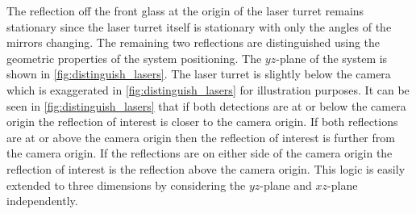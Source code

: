 The reflection off the front glass at the origin of the laser turret remains stationary since the laser turret itself is stationary with only the angles of the mirrors changing. The remaining two reflections are distinguished using the geometric properties of the system positioning. The $yz$-plane of the system is shown in \autoref{fig:distinguish_lasers}. The laser turret is slightly below the camera which is exaggerated in \autoref{fig:distinguish_lasers} for illustration purposes. It can be seen in \autoref{fig:distinguish_lasers} that if both detections are at or below the camera origin the reflection of interest is closer to the camera origin. If both reflections are at or above the camera origin then the reflection of interest is further from the camera origin. If the reflections are on either side of the camera origin the reflection of interest is the reflection above the camera origin. This logic is easily extended to three dimensions by considering the $yz$-plane and $xz$-plane independently.
